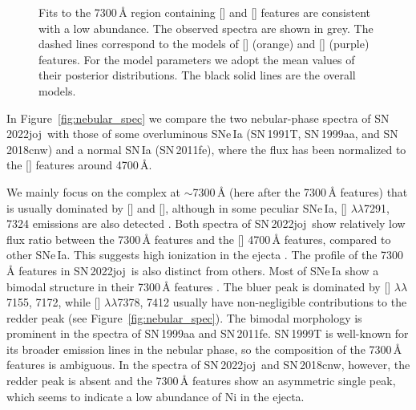 \documentclass[twocolumn]{aastex631}
\newcommand{\sn}{SN\,2022joj}
\begin{document}
\begin{CJK*}{UTF8}{gbsn}
\begin{figure}
    \caption{Fits to the 7300\,\r{A} region containing [] and [] features are consistent with a low  abundance. The observed spectra are shown in grey. The dashed lines correspond to the models of [] (orange) and [] (purple) features. For the model parameters we adopt the mean values of their posterior distributions. The black solid lines are the overall models.}
    \label{fig:Fe_ni}
\end{figure}
In Figure~\ref{fig:nebular_spec} we compare the two nebular-phase spectra of \sn\ with those of some overluminous SNe\,Ia (SN\,1991T, SN\,1999aa, and SN\,2018cnw) and a normal SN\,Ia (SN\,2011fe), where the flux has been normalized to the [] features around 4700\,\r{A}. 

We mainly focus on the complex at $\sim$7300\,\r{A} (here after the 7300\,\r{A} features) that is usually dominated by [] and [], although in some peculiar SNe\,Ia, [] $\lambda\lambda$7291, 7324 emissions are also detected \cite[e.g.,][]{Siebert_2020}. Both spectra of \sn\ show relatively low flux ratio between the 7300\,\r{A} features and the [] 4700\,\r{A} features, compared to other SNe\,Ia. This suggests high ionization in the ejecta \citep{Wilk_2020}. The profile of the 7300\,\r{A} features in \sn\ is also distinct from others. Most of SNe\,Ia show a bimodal structure in their 7300\,\r{A} features \citep[e.g.,][]{Graham_2017,Maguire_2018}. The bluer peak is dominated by [] $\lambda\lambda$7155, 7172, while [] $\lambda\lambda$7378, 7412 usually have non-negligible contributions to the redder peak (see Figure~\ref{fig:nebular_spec}). The bimodal morphology is prominent in the spectra of SN\,1999aa and SN\,2011fe. SN\,1999T is well-known for its broader emission lines in the nebular phase, so the composition of the 7300\,\r{A} features is ambiguous. In the spectra of \sn\ and SN\,2018cnw, however, the redder peak is absent and the 7300\,\r{A} features show an asymmetric single peak, which seems to indicate a low abundance of Ni in the ejecta. 


\end{CJK*}
\end{document}

